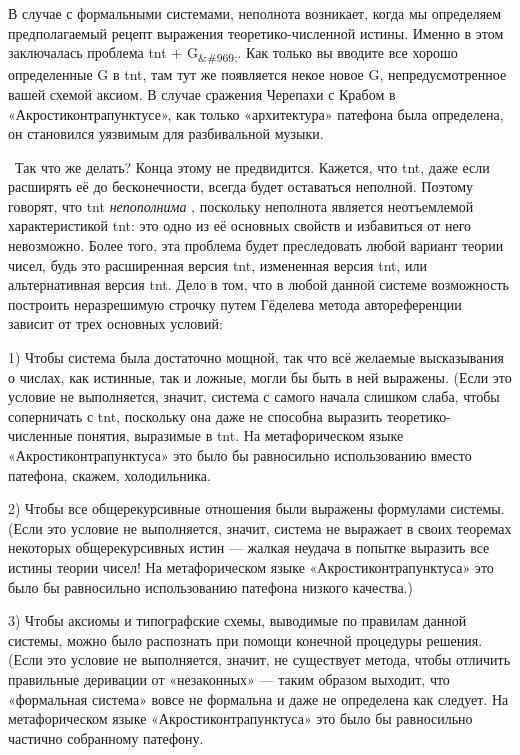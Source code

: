 \documentclass[../main.tex]{subfiles}
\begin{document}
В случае с формальными системами, неполнота возникает, когда мы определяем предполагаемый рецепт выражения теоретико-численной истины. Именно в этом заключалась проблема \acs{tnt} + G\textsubscript{\&\#969;}. Как только вы вводите все хорошо определенные G в \acs{tnt}, там тут же появляется некое новое G, непредусмотренное вашей схемой аксиом. В случае сражения Черепахи с Крабом в «Акростиконтрапунктусе», как только «архитектура» патефона была определена, он становился уязвимым для разбивальной музыки.

~Так что же делать? Конца этому не предвидится. Кажется, что \acs{tnt}, даже если расширять её до бесконечности, всегда будет оставаться неполной. Поэтому говорят, что \acs{tnt} \emph{непополнима} , поскольку неполнота является неотъемлемой характеристикой \acs{tnt}: это одно из её основных свойств и избавиться от него невозможно. Более того, эта проблема будет преследовать любой вариант теории чисел, будь это расширенная версия \acs{tnt}, измененная версия \acs{tnt}, или альтернативная версия \acs{tnt}\@. Дело в том, что в любой данной системе возможность построить неразрешимую строчку путем Гёделева метода автореференции зависит от трех основных условий:

1) Чтобы система была достаточно мощной, так что всё желаемые высказывания о числах, как истинные, так и ложные, могли бы быть в ней выражены. (Если это условие не выполняется, значит, система с самого начала слишком слаба, чтобы соперничать с \acs{tnt}, поскольку она даже не способна выразить теоретико-численные понятия, выразимые в \acs{tnt}\@. На метафорическом языке «Акростиконтрапунктуса» это было бы равносильно использованию вместо патефона, скажем, холодильника.

2) Чтобы все общерекурсивные отношения были выражены формулами системы. (Если это условие не выполняется, значит, система не выражает в своих теоремах некоторых общерекурсивных истин --- жалкая неудача в попытке выразить все истины теории чисел! На метафорическом языке «Акростиконтрапунктуса» это было бы равносильно использованию патефона низкого качества.)

3) Чтобы аксиомы и типографские схемы, выводимые по правилам данной системы, можно было распознать при помощи конечной процедуры решения. (Если это условие не выполняется, значит, не существует метода, чтобы отличить правильные деривации от «незаконных» --- таким образом выходит, что «формальная система» вовсе не формальна и даже не определена как следует. На метафорическом языке «Акростиконтрапунктуса» это было бы равносильно частично собранному патефону.
\end{document}
